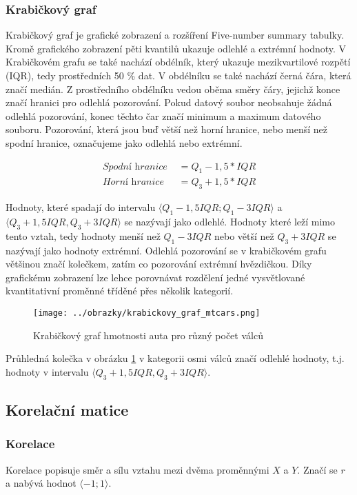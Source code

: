 \subsubsection{Krabičkový graf}
Krabičkový graf je grafické zobrazení a rozšíření Five-number summary tabulky. Kromě grafického zobrazení 
pěti kvantilů  ukazuje odlehlé a extrémní hodnoty.
V Krabičkovém grafu se také nachází obdélník, který ukazuje mezikvartilové rozpětí (IQR), tedy prostředních 50 \% dat. V obdélníku se také nachází černá čára, která značí medián.
Z prostředního obdélníku vedou oběma směry čáry, jejichž konce značí hranici pro odlehlá pozorování. Pokud datový soubor neobsahuje žádná odlehlá pozorování, konec těchto čar
značí minimum a maximum datového souboru.
Pozorování, která jsou buď větší než horní hranice, nebo menší než spodní hranice, označujeme jako 
{\color{red}
odlehlá
}
nebo extrémní. 

\begin{align}
    \textit{Spodní hranice } &= Q_1 - 1,5 * IQR \\
    \textit{Horní hranice } &= Q_3 + 1,5 * IQR
\end{align}

Hodnoty, které spadají do intervalu $\langle Q_1 - 1,5IQR; Q_1 - 3IQR\rangle$ a $\langle Q_3 + 1,5IQR, Q_3 + 3IQR \rangle$ se nazývají jako odlehlé.
Hodnoty které leží mimo tento vztah, tedy hodnoty menší než $Q_1 - 3IQR$ nebo větší než $Q_3 + 3IQR$ se nazývají jako hodnoty extrémní.
{\color{red}
Odlehlá pozorování se v krabičkovém grafu většinou značí kolečkem, zatím co pozorování extrémní hvězdičkou.
}
Díky grafickému zobrazení lze lehce porovnávat rozdělení jedné vysvětlované kvantitativní proměnné tříděné přes několik kategorií.

\begin{figure}[H]
    \centering
    \texttt{[image: ../obrazky/krabickovy\_graf\_mtcars.png]}
    \caption{Krabičkový graf hmotnosti auta pro různý počet válců} 
    \label{fig:krabickovy_graf_mtcars}
\end{figure}

Průhledná kolečka v obrázku \ref{fig:krabickovy_graf_mtcars} v kategorii osmi válců značí odlehlé hodnoty, t.j. hodnoty
v intervalu $\langle Q_3 + 1,5IQR, Q_3 + 3IQR \rangle$.


\subsection{Korelační matice}
\subsubsection{Korelace}
Korelace popisuje směr a sílu vztahu mezi dvěma proměnnými $X$ a $Y$. Značí se $r$ a nabývá hodnot $\langle -1; 1 \rangle$.

